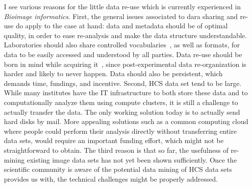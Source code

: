 I see various reasons for the little data re-use which is currently experienced in \textit{Bioimage informatics}. First, the general issues associated to dara sharing and re-use do apply to the case at hand: data and metadata should be of optimal quality, in order to ease re-analysis and make the data structure understandable. Laboratories should also share controlled vocabularies~\cite{pmid18603566}, as well as formats, for data to be easily accessed and understood by all parties. Data re-use should be born in mind while acquiring it~\cite{pmid23047157}, since post-experimental data re-organization is harder and likely to never happen. %
Data should also be persistent, which demands time, fundings, and incentive.  %
Second, HCS data set tend to be large. While many institutes have the IT infrastructure to both store these data and to computationally analyze them using compute clusters, it is still a challenge to actually transfer the data. The only working solution today is to actually send hard disks by mail. More appealing solutions such as a common computing cloud where people could perform their analysis directly without transferring entire data sets, would require an important funding effort, which might not be straightforward to obtain. The third reason is that so far, the usefulness of re-mining existing image data sets has not yet been shown sufficiently. Once the scientific community is aware of the potential data mining of HCS data sets provides us with, the technical challenges might be properly addressed. 

